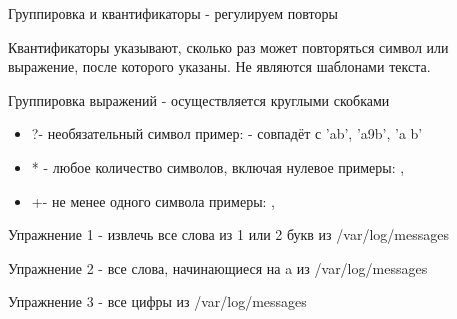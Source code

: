 \begin{frame}[fragile]{Группировка и квантификаторы - регулируем повторы}

  \alert{Квантификаторы} указывают, сколько раз может повторяться символ или выражение, после которого указаны.  Не являются шаблонами текста.

  \alert{Группировка выражений} - осуществляется круглыми скобками \footnotemark[22] 

  \begin{itemize}
    \item \alert{?}\footnotemark[22] - необязательный символ \newline
      пример:  - совпадёт с 'ab', 'a9b', 'a b' \pause
    \item \alert{*} - любое количество символов, включая нулевое \newline
      примеры: , \regex{[[:digit:]]*} \pause
    \item \alert{+}\footnotemark[22] - не менее одного символа \newline
      примеры: \regex{[a-d]+}, 
  \end{itemize}

  \alert{Упражнение 1} - извлечь все слова из 1 или 2 букв из /var/log/messages
  
  \alert{Упражнение 2} - все слова, начинающиеся на a из /var/log/messages
  
  \alert{Упражнение 3} - все цифры из /var/log/messages
  
  
\end{frame}



